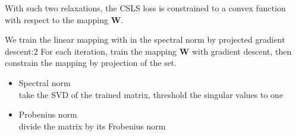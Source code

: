 With such two relaxations, the CSLS loss is constrained to a convex function with respect to the mapping $\bm{W}$.

We train the linear mapping with in the spectral norm by projected gradient descent:$2$ 
For each iteration, train the mapping $\bm{W}$ with gradient descent, then constrain the mapping by projection of the set.
\begin{itemize}
	\item Spectral norm\\
	take the SVD of the trained matrix, threshold the singular values to one
	\item Probenius norm\\
	divide the matrix by its Frobenius norm
\end{itemize} 



	
	